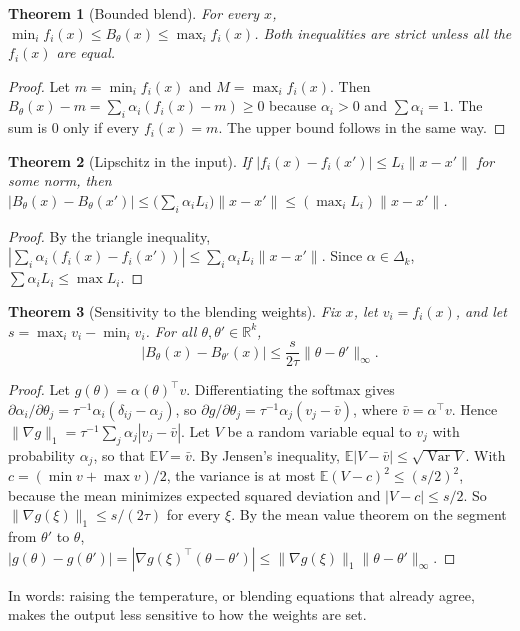 \documentclass[11pt]{article}
\newtheorem{theorem}{Theorem}
\theoremstyle{definition}
\theoremstyle{remark}
\newcommand{\R}{\mathbb{R}}
\newcommand{\Simp}{\Delta}
\newcommand{\norm}[1]{\lVert #1\rVert}
\newcommand{\ninf}[1]{\lVert #1\rVert_\infty}
\begin{document}
\begin{theorem}[Bounded blend]\label{thm:bounds}
For every $x$, $\min_if_i(x)\le B_\theta(x)\le\max_if_i(x)$. Both inequalities are strict unless all the $f_i(x)$ are equal.
\end{theorem}
\begin{proof}
Let $m=\min_if_i(x)$ and $M=\max_if_i(x)$. Then $B_\theta(x)-m=\sum_i\alpha_i(f_i(x)-m)\ge0$ because $\alpha_i>0$ and $\sum\alpha_i=1$. The sum is $0$ only if every $f_i(x)=m$. The upper bound follows in the same way.
\end{proof}

\begin{theorem}[Lipschitz in the input]\label{thm:lipx}
If $|f_i(x)-f_i(x')|\le L_i\norm{x-x'}$ for some norm, then $|B_\theta(x)-B_\theta(x')|\le\big(\sum_i\alpha_iL_i\big)\norm{x-x'}\le(\max_iL_i)\norm{x-x'}$.
\end{theorem}
\begin{proof}
By the triangle inequality, $|\sum_i\alpha_i(f_i(x)-f_i(x'))|\le\sum_i\alpha_iL_i\norm{x-x'}$. Since $\alpha\in\Simp_k$, $\sum\alpha_iL_i\le\max L_i$.
\end{proof}

\begin{theorem}[Sensitivity to the blending weights]\label{thm:liptheta}
Fix $x$, let $v_i=f_i(x)$, and let $s=\max_iv_i-\min_iv_i$. For all $\theta,\theta'\in\R^k$,
\[|B_\theta(x)-B_{\theta'}(x)|\le\frac{s}{2\tau}\ninf{\theta-\theta'}.\]
\end{theorem}
\begin{proof}
Let $g(\theta)=\alpha(\theta)^\top v$. Differentiating the softmax gives $\partial\alpha_i/\partial\theta_j=\tau^{-1}\alpha_i(\delta_{ij}-\alpha_j)$, so $\partial g/\partial\theta_j=\tau^{-1}\alpha_j(v_j-\bar v)$, where $\bar v=\alpha^\top v$. Hence $\norm{\nabla g}_1=\tau^{-1}\sum_j\alpha_j|v_j-\bar v|$. Let $V$ be a random variable equal to $v_j$ with probability $\alpha_j$, so that $\mathbb E V=\bar v$. By Jensen's inequality, $\mathbb E|V-\bar v|\le\sqrt{\operatorname{Var}V}$. With $c=(\min v+\max v)/2$, the variance is at most $\mathbb E(V-c)^2\le(s/2)^2$, because the mean minimizes expected squared deviation and $|V-c|\le s/2$. So $\norm{\nabla g(\xi)}_1\le s/(2\tau)$ for every $\xi$. By the mean value theorem on the segment from $\theta'$ to $\theta$, $|g(\theta)-g(\theta')|=|\nabla g(\xi)^\top(\theta-\theta')|\le\norm{\nabla g(\xi)}_1\ninf{\theta-\theta'}$.
\end{proof}
In words: raising the temperature, or blending equations that already agree, makes the output less sensitive to how the weights are set.
\end{document}
